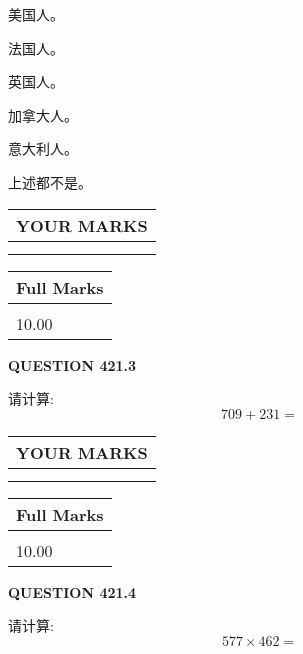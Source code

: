 \documentclass{ctexart}
\begin{document}
  
 
 
美国人。
 
 
法国人。
 
 
英国人。
 
 
加拿大人。
 
 
意大利人。
 
 
 上述都不是。
 
 
  
\vspace{0.2in}
  
\noindent\begin{tabular}{|l|}
\hline
 YOUR MARKS  \\
\hline
 \\ 
 \\ 
\hline
\end{tabular}
\hspace{0.05in} \begin{tabular}{|l|}
\hline
 Full Marks  \\
\hline
 \\ 
10.00 \\
\hline
\end{tabular}
{\textbf{\Large{QUESTION
421.3 
}}}
  
  
 
请计算:
\begin{equation}
709 +  %
231 = \nonumber
\end{equation}
 

 

 
  
\vspace{0.2in}
  
\noindent\begin{tabular}{|l|}
\hline
 YOUR MARKS  \\
\hline
 \\ 
 \\ 
\hline
\end{tabular}
\hspace{0.05in} \begin{tabular}{|l|}
\hline
 Full Marks  \\
\hline
 \\ 
10.00 \\
\hline
\end{tabular}
{\textbf{\Large{QUESTION
421.4 
}}}
  
  
 
请计算:
\begin{equation}
577  \times    %
462 = \nonumber
\end{equation}
 
\end{document}
